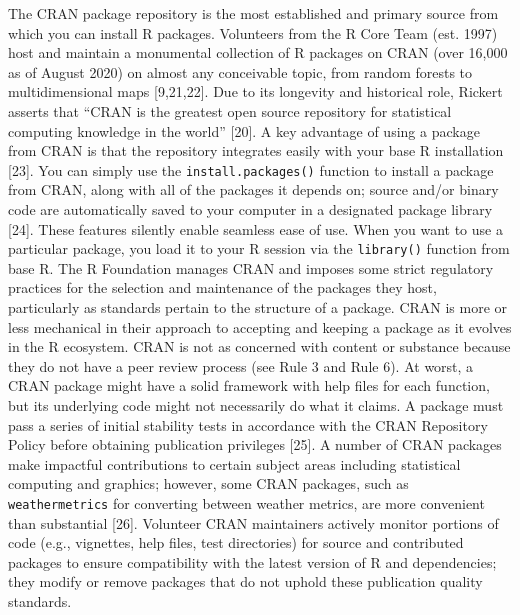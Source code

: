 \documentclass[10pt,letterpaper]{article}
\begin{document}
The CRAN package repository is the most established and primary source
from which you can install R packages. Volunteers from the R Core Team
(est. 1997) host and maintain a monumental collection of R packages on
CRAN (over 16,000 as of August 2020) on almost any conceivable topic,
from random forests to multidimensional maps {[}9,21,22{]}. Due to its
longevity and historical role, Rickert asserts that ``CRAN is the
greatest open source repository for statistical computing knowledge in
the world'' {[}20{]}. A key advantage of using a package from CRAN is
that the repository integrates easily with your base R installation
{[}23{]}. You can simply use the \texttt{install.packages()} function to
install a package from CRAN, along with all of the packages it depends
on; source and/or binary code are automatically saved to your computer
in a designated package library {[}24{]}. These features silently enable
seamless ease of use. When you want to use a particular package, you
load it to your R session via the \texttt{library()} function from base
R. The R Foundation manages CRAN and imposes some strict regulatory
practices for the selection and maintenance of the packages they host,
particularly as standards pertain to the structure of a package. CRAN is
more or less mechanical in their approach to accepting and keeping a
package as it evolves in the R ecosystem. CRAN is not as concerned with
content or substance because they do not have a peer review process (see
Rule 3 and Rule 6). At worst, a CRAN package might have a solid
framework with help files for each function, but its underlying code
might not necessarily do what it claims. A package must pass a series of
initial stability tests in accordance with the CRAN Repository Policy
before obtaining publication privileges {[}25{]}. A number of CRAN
packages make impactful contributions to certain subject areas including
statistical computing and graphics; however, some CRAN packages, such as
\texttt{weathermetrics} for converting between weather metrics, are more
convenient than substantial {[}26{]}. Volunteer CRAN maintainers
actively monitor portions of code (e.g., vignettes, help files, test
directories) for source and contributed packages to ensure compatibility
with the latest version of R and dependencies; they modify or remove
packages that do not uphold these publication quality standards.
\end{document}
